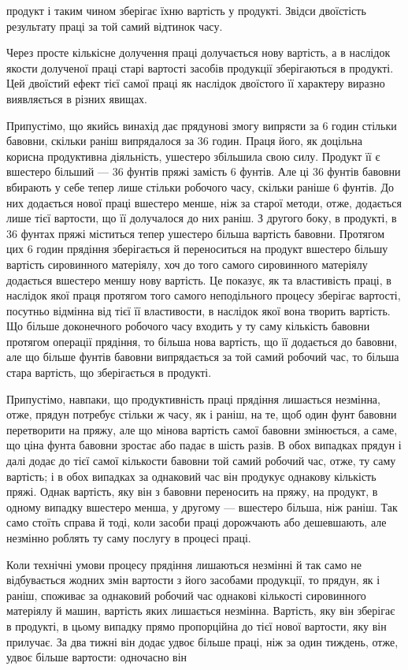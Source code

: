 \parcont{}  %
продукт і таким чином зберігає їхню вартість у продукті. Звідси
двоїстість результату праці за той самий відтинок часу.

Через просте кількісне долучення праці долучається нову
вартість, а в наслідок якости долученої праці старі вартості засобів
продукції зберігаються в продукті. Цей двоїстий ефект тієї
самої праці як наслідок двоїстого її характеру виразно виявляється
в різних явищах.

Припустімо, що якийсь винахід дає прядунові змогу випрясти
за 6 годин стільки бавовни, скільки раніш випрядалося за 36 годин.
Праця його, як доцільна корисна продуктивна діяльність,
ушестеро збільшила свою силу. Продукт її є вшестеро більший —
36 фунтів пряжі замість 6 фунтів. Але ці 36 фунтів бавовни вбирають
у себе тепер лише стільки робочого часу, скільки раніше
6 фунтів. До них додається нової праці вшестеро менше, ніж за
старої методи, отже, додається лише  тієї вартости, що її долучалося
до них раніш. З другого боку, в продукті, в 36 фунтах
пряжі міститься тепер ушестеро більша вартість бавовни. Протягом
цих 6 годин прядіння зберігається й переноситься на продукт
вшестеро більшу вартість сировинного матеріялу, хоч до
того самого сировинного матеріялу додається вшестеро меншу
нову вартість. Це показує, як та властивість праці, в наслідок
якої праця протягом того самого неподільного процесу зберігає
вартості, посутньо відмінна від тієї її властивости, в наслідок
якої вона творить вартість. Що більше доконечного робочого
часу входить у ту саму кількість бавовни протягом операції
прядіння, то більша нова вартість, що її додається до бавовни,
але що більше фунтів бавовни випрядається за той самий робочий
час, то більша стара вартість, що зберігається в продукті.

Припустімо, навпаки, що продуктивність праці прядіння лишається
незмінна, отже, прядун потребує стільки ж часу, як і раніш,
на те, щоб один фунт бавовни перетворити на пряжу, але що
мінова вартість самої бавовни змінюється, а саме, що ціна фунта
бавовни зростає або падає в шість разів. В обох випадках прядун
і далі додає до тієї самої кількости бавовни той самий робочий
час, отже, ту саму вартість; і в обох випадках за однаковий час
він продукує однакову кількість пряжі. Однак вартість, яку він
з бавовни переносить на пряжу, на продукт, в одному випадку
вшестеро менша, у другому — вшестеро більша, ніж раніш. Так
само стоїть справа й тоді, коли засоби праці дорожчають або
дешевшають, але незмінно роблять ту саму послугу в процесі
праці.

Коли технічні умови процесу прядіння лишаються незмінні
й так само не відбувається жодних змін вартости з його засобами
продукції, то прядун, як і раніш, споживає за однаковий робочий
час однакові кількості сировинного матеріялу й машин, вартість
яких лишається незмінна. Вартість, яку він зберігає в продукті,
в цьому випадку прямо пропорційна до тієї нової вартости, яку
він прилучає. За два тижні він додає удвоє більше праці, ніж
за один тиждень, отже, удвоє більше вартости: одночасно він
\parbreak{}  %
